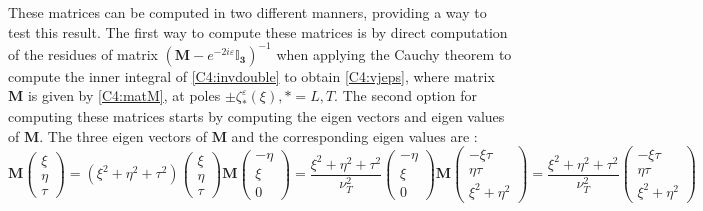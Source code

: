 These matrices can be computed in two different manners, providing a way to test this result. The first way to compute these matrices is by direct computation of the residues of matrix $(\mathbf{M}-e^{-2i\varepsilon}\mathbf{\mathbb{I}_3})^{-1}$ when applying the Cauchy theorem to compute the inner integral of \eqref{C4:invdouble} to obtain \eqref{C4:vjeps}, where matrix $\mathbf{M}$ is given by \eqref{C4:matM}, at poles $\pm \zeta^{\varepsilon}_*(\xi), *=L,T$. The second option for computing these matrices starts by computing the eigen vectors and eigen values of $\mathbf{M}$. The three eigen vectors of $\mathbf{M}$ and the corresponding eigen values are :
\begin{subequations}
\begin{equation}
    \mathbf{M}\begin{pmatrix}
    \xi \\ \eta \\ \tau 
    \end{pmatrix}
    =(\xi^2+\eta^2+\tau^2)\begin{pmatrix}
    \xi \\ \eta \\ \tau 
    \end{pmatrix}
\end{equation}
\begin{equation}
   \mathbf{M}\begin{pmatrix}
    -\eta \\ \xi \\ 0
    \end{pmatrix}
    =\frac{\xi^2+\eta^2+\tau^2}{\nu_T^2}\begin{pmatrix}
    -\eta \\ \xi \\ 0
    \end{pmatrix} 
\end{equation}
\begin{equation}
   \mathbf{M}\begin{pmatrix}
    -\xi\tau \\ \eta\tau \\ \xi^2+\eta^2
    \end{pmatrix}
    =\frac{\xi^2+\eta^2+\tau^2}{\nu_T^2}\begin{pmatrix}
    -\xi\tau \\ \eta\tau \\ \xi^2+\eta^2
    \end{pmatrix} 
\end{equation}
\end{subequations}
